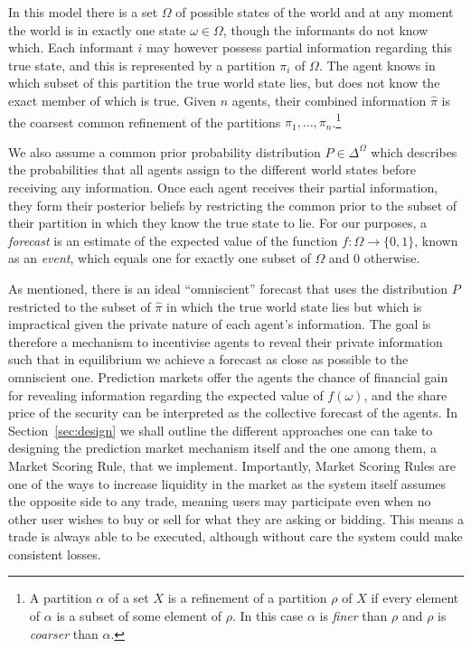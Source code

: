In this model there is a set $\Omega$ of possible states of the world and at
any moment the world is in exactly one state $\omega \in \Omega$, though the
informants do not know which. Each informant $i$ may however possess partial
information regarding this true state, and this is represented by a partition
$\pi_i$ of $\Omega$. The agent knows in which subset of this partition the true
world state lies, but does not know the exact member of which is true. Given
$n$ agents, their combined information $\hat{\pi}$ is the coarsest common
refinement of the partitions $\pi_1, \ldots, \pi_n$.\footnote{A partition
$\alpha$ of a set $X$ is a refinement of a partition $\rho$ of $X$ if every
element of $\alpha$ is a subset of some element of $\rho$. In this case
$\alpha$ is \emph{finer} than $\rho$ and $\rho$ is \emph{coarser} than
$\alpha$.}

We also assume a common prior probability distribution $P \in \Delta^{\Omega}$
which describes the probabilities that all agents assign to the different world
states before receiving any information. Once each agent receives their partial
information, they form their posterior beliefs by restricting the common prior
to the subset of their partition in which they know the true state to lie. For
our purposes, a \emph{forecast} is an estimate of the expected value of the
function $f : \Omega \rightarrow \{0,1\}$, known as an \emph{event}, which
equals one for exactly one subset of $\Omega$ and 0 otherwise.

As mentioned, there is an ideal ``omniscient'' forecast that uses the
distribution $P$ restricted to the subset of $\hat{\pi}$ in which the true
world state lies but which is impractical given the private nature of each
agent's information. The goal is therefore a mechanism to incentivise agents to
reveal their private information such that in equilibrium we achieve a forecast
as close as possible to the omniscient one. Prediction markets offer the agents
the chance of financial gain for revealing information regarding the expected
value of $f(\omega)$, and the share price of the security can be interpreted as
the collective forecast of the agents. In Section~\ref{sec:design} we shall
outline the different approaches one can take to designing the prediction
market mechanism itself and the one among them, a Market Scoring Rule, that we
implement. Importantly, Market Scoring Rules are one of the ways to increase
liquidity in the market as the system itself assumes the opposite side to any
trade, meaning users may participate even when no other user wishes to buy or
sell for what they are asking or bidding. This means a trade is always able to
be executed, although without care the system could make consistent losses.

